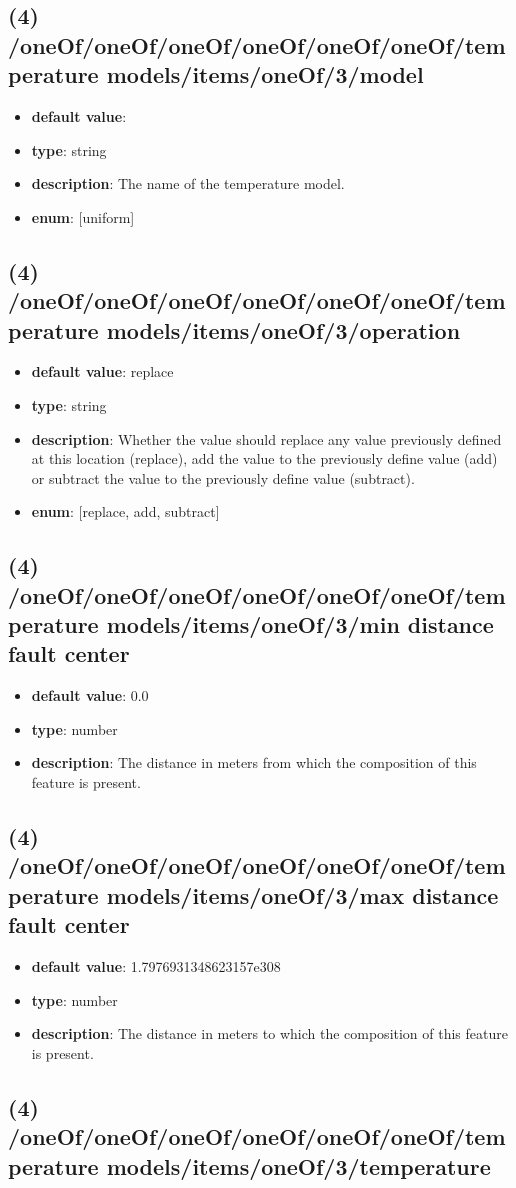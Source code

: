 \subsection{(4) /oneOf/oneOf/oneOf/oneOf/oneOf/oneOf/temperature models/items/oneOf/3/model}
\begin{itemize}[leftmargin=4em]\item {\bf default value}: 
\item {\bf type}: string
\item {\bf description}: The name of the temperature model.
\item {\bf enum}: [uniform]\end{itemize}\subsection{(4) /oneOf/oneOf/oneOf/oneOf/oneOf/oneOf/temperature models/items/oneOf/3/operation}
\begin{itemize}[leftmargin=4em]\item {\bf default value}: replace
\item {\bf type}: string
\item {\bf description}: Whether the value should replace any value previously defined at this location (replace), add the value to the previously define value (add) or subtract the value to the previously define value (subtract).
\item {\bf enum}: [replace, add, subtract]\end{itemize}\subsection{(4) /oneOf/oneOf/oneOf/oneOf/oneOf/oneOf/temperature models/items/oneOf/3/min distance fault center}
\begin{itemize}[leftmargin=4em]\item {\bf default value}: 0.0
\item {\bf type}: number
\item {\bf description}: The distance in meters from which the composition of this feature is present.
\end{itemize}\subsection{(4) /oneOf/oneOf/oneOf/oneOf/oneOf/oneOf/temperature models/items/oneOf/3/max distance fault center}
\begin{itemize}[leftmargin=4em]\item {\bf default value}: 1.7976931348623157e308
\item {\bf type}: number
\item {\bf description}: The distance in meters to which the composition of this feature is present.
\end{itemize}\subsection{(4) /oneOf/oneOf/oneOf/oneOf/oneOf/oneOf/temperature models/items/oneOf/3/temperature}

